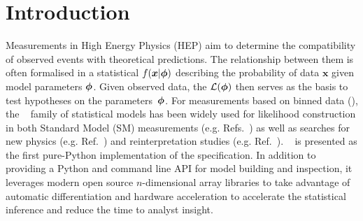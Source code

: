 \section{Introduction}\label{sec:introduction}
Measurements in High Energy Physics (HEP) aim to determine the compatibility of observed events with theoretical predictions.
The relationship between them is often formalised in a statistical  $f(\bm{x}|\bm{\phi})$ describing the probability of data $\bm{x}$ given model parameters $\bm{\phi}$.
Given observed data, the  $\mathcal{L}(\bm{\phi})$ then serves as the basis to test hypotheses on the parameters~$\bm{\phi}$.
For measurements based on binned data (), the \HiFa{}~\cite{Cranmer:1456844} family of statistical models has been widely used for likelihood construction in both Standard Model (SM) measurements (e.g. Refs.~\cite{HIGG-2013-02,Aaij:2015sqa}) as well as searches for new physics (e.g. Ref.~\cite{ATLAS-CONF-2018-041}) and reinterpretation studies (e.g. Ref.~\cite{Heinrich:2018nip}).
\pyhf{}~\cite{pyhf,pyhf_joss} is presented as the first pure-Python implementation of the \HiFa{} specification.
In addition to providing a Python and command line API for \HiFa{} model building and inspection, it leverages modern open source $n$-dimensional array libraries to take advantage of automatic differentiation and hardware acceleration to accelerate the statistical inference and reduce the time to analyst insight.

